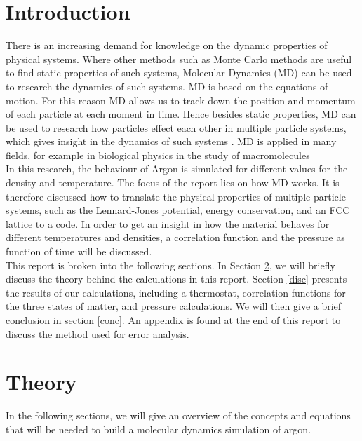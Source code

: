 \documentclass{article}
\begin{document}
\begin{multicols}{2}

\section{Introduction}

There is an increasing demand for knowledge on the dynamic properties of physical systems. Where other methods such as Monte Carlo methods are useful to find static properties of such systems, Molecular Dynamics (MD) can be used to research the dynamics of such systems. MD is based on the equations of motion. For this reason MD allows us to track down the position and momentum of each particle at each moment in time. Hence besides static properties, MD can be used to research how particles effect each other in multiple particle systems, which gives insight in the dynamics of such systems \cite{thijssen}. MD is applied in many fields, for example in biological physics in the study of macromolecules \cite{deGroot} \\

In this research, the behaviour of Argon is simulated for different values for the density and temperature. The focus of the report lies on how MD works. It is therefore discussed how to translate the physical properties of multiple particle systems, such as the Lennard-Jones potential, energy conservation, and an FCC lattice to a code. In order to get an insight in how the material behaves for different temperatures and densities, a correlation function and the pressure as function of time will be discussed. \\

This report is broken into the following sections.  In Section \ref{theory}, we will briefly discuss the theory behind the calculations in this report.  Section \ref{disc} presents the results of our calculations, including a thermostat, correlation functions for the three states of matter, and pressure calculations.  We will then give a brief conclusion in section \ref{conc}.  An appendix is found at the end of this report to discuss the method used for error analysis.  

\section{Theory}
\label{theory}

In the following sections, we will give an overview of the concepts and equations that will be needed to build a molecular dynamics simulation of argon.


\end{multicols}
\end{document}
